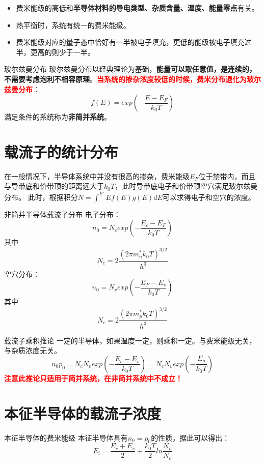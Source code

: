 \begin{remark}
    \begin{itemize}
        \item 费米能级的高低和\textbf{半导体材料的导电类型、杂质含量、温度、能量零点}有关。
        \item 热平衡时，系统有统一的费米能级。
        \item 费米能级对应的量子态中恰好有一半被电子填充，更低的能级被电子填充过半，更高的则少于一半。
    \end{itemize}
    
\end{remark}

\begin{definition}{玻尔兹曼分布}
    玻尔兹曼分布以经典理论为基础，\textbf{能量可以取任意值，是连续的，不需要考虑泡利不相容原理}。\textbf{\textcolor{red}{当系统的掺杂浓度较低的时候，费米分布退化为玻尔兹曼分布}}：
    \[
    f(E)=exp(-\frac{E-E_F}{k_0T})
    \]
    满足条件的系统称为\textbf{非简并系统}。
\end{definition}

\section{载流子的统计分布}
在一般情况下，半导体系统中并没有很高的掺杂，费米能级$E_F$位于禁带内，而且与导带底和价带顶的距离远大于$k_0T$，此时导带底电子和价带顶空穴满足玻尔兹曼分布。
此时，根据积分$N=\int^{E'}{E}f(E)g(E)dE$可以求得电子和空穴的浓度。

\begin{theorem}{非简并半导体载流子分布}
    电子分布：
    \[n_0=N_c exp(-\frac{E_c-E_F}{k_0 T})\]
    其中
    \[N_c=2 \frac{(2\pi m_n^{*}k_0T)^{3/2}}{h^3}\]
    空穴分布：
    \[n_0=N_v exp(-\frac{E_F-E_v}{k_0 T})\]
    其中
    \[N_c=2 \frac{(2\pi m_p^{*}k_0T)^{3/2}}{h^3}\]

\end{theorem}

\begin{theorem}{载流子乘积推论}
    一定的半导体，如果温度一定，则乘积一定。与费米能级无关，与杂质浓度无关。
    \[n_0p_0 = N_cN_vexp(-\frac{E_c-E_v}{k_0T})=N_cN_vexp(-\frac{E_g}{k_0T})\]
    \textbf{\textcolor{red}{注意此推论只适用于简并系统，在非简并系统中不成立！}}
\end{theorem}

\section{本征半导体的载流子浓度}
\begin{theorem}{本征半导体的费米能级}
    本征半导体具有$n_0=p_0$的性质，据此可以得出：
    \[E_i=\frac{E_c+E_v}{2}+\frac{k_0T}{2}ln\frac{N_v}{N_c}\]

\end{theorem}


